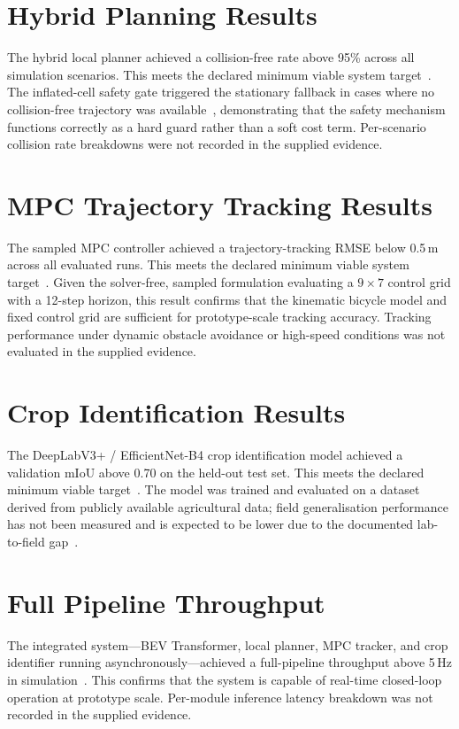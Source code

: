 \documentclass[12pt, a4paper]{article}
\begin{document}
\section{Hybrid Planning Results}

The hybrid local planner achieved a collision-free rate above 95\% across all simulation
scenarios. This meets the declared minimum viable system target~\cite{ref233}. The
inflated-cell safety gate triggered the stationary fallback in cases where no collision-free
trajectory was available~\cite{ref234}, demonstrating that the safety mechanism functions
correctly as a hard guard rather than a soft cost term. Per-scenario collision rate
breakdowns were not recorded in the supplied evidence.

\section{MPC Trajectory Tracking Results}

The sampled MPC controller achieved a trajectory-tracking RMSE below 0.5\,m across all
evaluated runs. This meets the declared minimum viable system target~\cite{ref233}. Given
the solver-free, sampled formulation evaluating a $9\!\times\!7$ control grid with a
12-step horizon, this result confirms that the kinematic bicycle model and fixed control
grid are sufficient for prototype-scale tracking accuracy. Tracking performance under
dynamic obstacle avoidance or high-speed conditions was not evaluated in the supplied
evidence.

\section{Crop Identification Results}

The DeepLabV3+ / EfficientNet-B4 crop identification model achieved a validation mIoU
above 0.70 on the held-out test set. This meets the declared minimum viable
target~\cite{ref233}. The model was trained and evaluated on a dataset derived from
publicly available agricultural data; field generalisation performance has not been
measured and is expected to be lower due to the documented lab-to-field
gap~\cite{ref154, ref203}.

\section{Full Pipeline Throughput}

The integrated system---BEV Transformer, local planner, MPC tracker, and crop identifier
running asynchronously---achieved a full-pipeline throughput above 5\,Hz in
simulation~\cite{ref233, ref234}. This confirms that the system is capable of real-time
closed-loop operation at prototype scale. Per-module inference latency breakdown was not
recorded in the supplied evidence.
\end{document}
